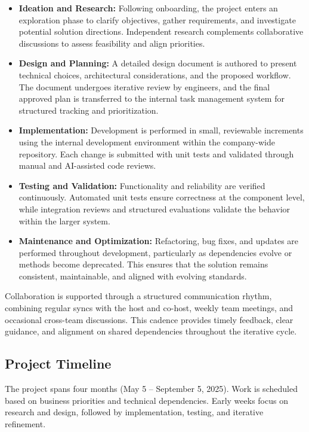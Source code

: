 \begin{spacing}{1.2}
\begin{itemize}
    \item \textbf{Ideation and Research:} Following onboarding, the project enters an exploration phase to clarify objectives, gather requirements, and investigate potential solution directions. Independent research complements collaborative discussions to assess feasibility and align priorities.

    \item \textbf{Design and Planning:} A detailed design document is authored to present technical choices, architectural considerations, and the proposed workflow. The document undergoes iterative review by engineers, and the final approved plan is transferred to the internal task management system for structured tracking and prioritization.

    \item \textbf{Implementation:} Development is performed in small, reviewable increments using the internal development environment within the company-wide repository. Each change is submitted with unit tests and validated through manual and AI-assisted code reviews.

    \item \textbf{Testing and Validation:} Functionality and reliability are verified continuously. Automated unit tests ensure correctness at the component level, while integration reviews and structured evaluations validate the behavior within the larger system.

    \item \textbf{Maintenance and Optimization:} Refactoring, bug fixes, and updates are performed throughout development, particularly as dependencies evolve or methods become deprecated. This ensures that the solution remains consistent, maintainable, and aligned with evolving standards.
\end{itemize}

Collaboration is supported through a structured communication rhythm, combining regular syncs with the host and co-host, weekly team meetings, and occasional cross-team discussions. This cadence provides timely feedback, clear guidance, and alignment on shared dependencies throughout the iterative cycle.


\subsection{Project Timeline}
The project spans four months (May 5 – September 5, 2025). Work is scheduled based on business priorities and technical dependencies. Early weeks focus on research and design, followed by implementation, testing, and iterative refinement.


\end{spacing}
